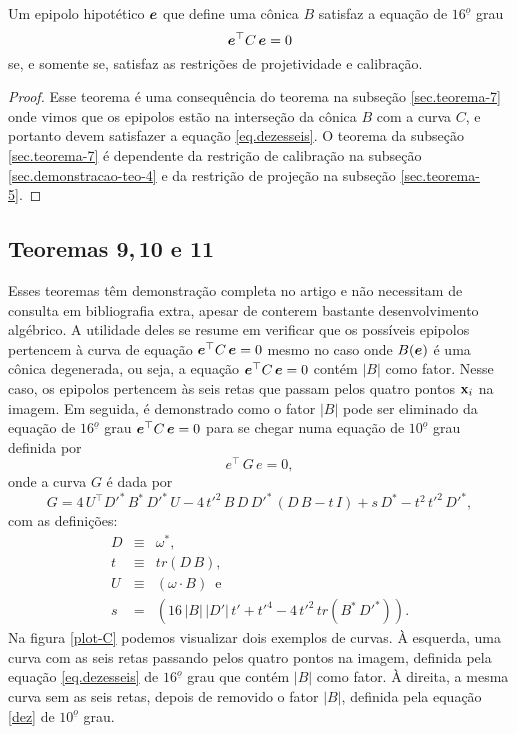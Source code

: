 \begin{teorema} 
Um epipolo hipotético $\boldsymbol{e}$ que define uma cônica $B$ satisfaz a equação de $16^{\underline{o}}$ grau 
\begin{equation}\label{eq.dezesseis}
\boldsymbol{e}^\top C\,\boldsymbol{e}=0
\end{equation}
se, e somente se, satisfaz as restrições de projetividade e calibração.
\end{teorema}
\begin{proof}
Esse teorema é uma consequência do teorema na subseção \ref{sec.teorema-7} onde vimos que os epipolos estão na interseção da cônica $B$ com a curva $C$, e portanto devem satisfazer a equação \ref{eq.dezesseis}. O teorema da subseção \ref{sec.teorema-7} é dependente da restrição de calibração na subseção \ref{sec.demonstracao-teo-4} e da restrição de projeção na subseção \ref{sec.teorema-5}. 
\end{proof}

\subsection{Teoremas 9,\,10 e 11}
Esses teoremas têm demonstração completa no artigo e não necessitam de consulta em bibliografia extra, apesar de conterem bastante desenvolvimento algébrico. A utilidade deles se resume em verificar que os possíveis epipolos pertencem à curva de equação $\boldsymbol{e}^\top C\,\boldsymbol{e}=0$ mesmo no caso onde $B(\boldsymbol{e})$ é uma cônica degenerada, ou seja, a equação $\boldsymbol{e}^\top C\,\boldsymbol{e}=0$ contém $|B|$ como fator.   Nesse caso, os epipolos pertencem às seis retas que passam pelos quatro pontos $\mathbf{x}_i$ na imagem. Em seguida, é demonstrado como o fator $|B|$ pode ser eliminado da equação de $16^{\underline{o}}$ grau $\boldsymbol{e}^\top C\,\boldsymbol{e}=0$ para se chegar numa equação de $10^{\underline{o}}$ grau definida por
\begin{equation}
e^\top\,G\,e=0,
\label{dez}
\end{equation}
onde a curva $G$ é dada por
\begin{equation}
G=4\,U^\top D'^*\,B^*\,D'^*\,U-4\,t'^2\,B\,D\,D'^*\,(D\,B-t\,I)+s\,D^*-t^2\,t'^2\,D'^*,
\label{conica-G}
\end{equation}
com as definições:
\begin{equation*}
\begin{array}{rcl}
D&\equiv&\omega^*,\\
t&\equiv&tr(D\,B),\\
U&\equiv&(\omega \cdot B)\,\,\, \text{e}\\
s&=&(16\,|B|\,|D'|\,t'+t'^4-4\,t'^2\,tr(B^*\,D'^*)).
\end{array}
\end{equation*}
Na figura \ref{plot-C} podemos visualizar dois exemplos de curvas. À esquerda, uma curva com as seis retas passando pelos quatro pontos na imagem, definida pela equação \ref{eq.dezesseis} de $16^{\underline{o}}$ grau que contém $|B|$ como fator. À direita, a mesma curva sem as seis retas, depois de removido o fator $|B|$, definida pela equação \ref{dez} de $10^{\underline{o}}$ grau.   

